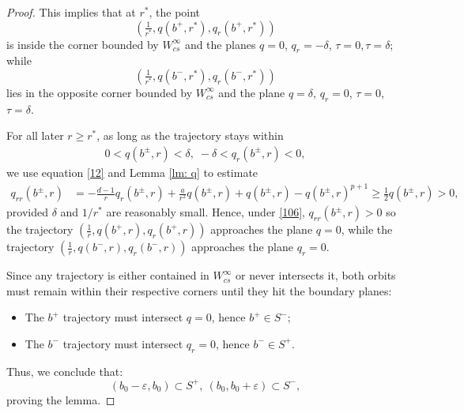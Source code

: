 \documentclass[12pt]{amsart}
\newcommand{\eps}{\varepsilon}
\begin{document}
\begin{proof}
This implies that at $r^*$, the point 
\[
(\tfrac 1{r^*},q(b^+,r^*), q_r(b^+,r^*))
\] is inside the corner bounded by $W^\infty_{cs}$ and the planes $q=0$, $q_r=-\delta$, $\tau=0, \tau=\delta$; while 
\[
(\tfrac 1{r^*},q(b^-,r^*), q_r(b^-,r^*))
\] 
lies in the opposite corner bounded by $W^\infty_{cs}$ and the plane $q=\delta$, $q_r=0$, $\tau=0$, $\tau=\delta$. 

For all later $r\ge r^*$, as long as the trajectory stays within
\begin{align}\label{106}
0<q(b^{\pm}, r)<\delta, \; -\delta<q_r(b^{\pm},r)<0,
\end{align}
we use equation \eqref{12} and Lemma \ref{lm: q} to estimate
\begin{align*}
q_{rr}(b^\pm,r)&=-\tfrac{d-1}r q_r(b^{\pm}, r)+\tfrac a{r^2}q(b^\pm, r)+q(b^\pm, r)-q(b^\pm, r)^{p+1} \ge \frac 12 q(b^\pm, r)>0, 
\end{align*}
provided $\delta$ and $1/r^*$ are reasonably small. 
Hence, under \eqref{106}, $q_{rr}(b^{\pm},r)>0$ so the trajectory $(\tfrac 1r, q(b^+, r), q_r(b^+, r))$ approaches the plane $q=0$, while the trajectory $(\tfrac 1r, q(b^-, r), q_r(b^-, r))$ approaches the plane $q_r=0$. %

Since any trajectory is either contained in $W_{cs}^\infty$ or never intersects it, both orbits must remain within their respective corners until they hit the boundary planes:
\begin{itemize}
\item The $b^+$ trajectory must intersect $q=0$, hence $b^+\in S^-$;
\item The $b^-$ trajectory must intersect $q_r=0$, hence $b^-\in S^+$.
\end{itemize}
Thus, we conclude that: 
\[
(b_0-\eps, b_0)\subset S^+, \ (b_0, b_0+\eps)\subset S^-,
\]
proving the lemma. 
\end{proof}
\end{document}
